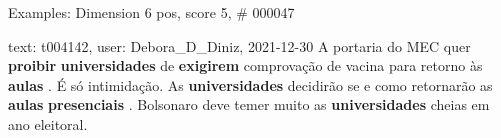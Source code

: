 \begin{frame}{Examples: Dimension 6 pos, score 5, \# 000047}
\footnotesize
\begin{exampleblock}{text: t004142, user: Debora\_D\_Diniz, 2021-12-30}
A portaria do MEC quer \textbf{proibir} \textbf{universidades} de 
\textbf{exigirem} comprovação de vacina para retorno às \textbf{aulas} . É só 
intimidação. As \textbf{universidades} decidirão se e como retornarão as 
\textbf{aulas} \textbf{presenciais} .  Bolsonaro deve 
temer muito as \textbf{universidades} cheias em ano eleitoral. 
\end{exampleblock}
\end{frame}
